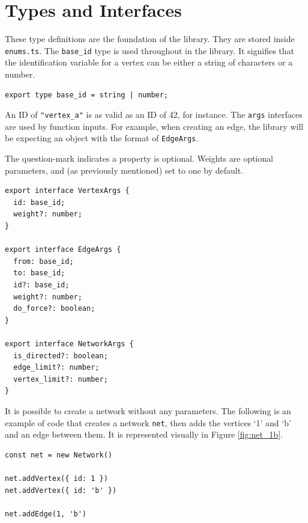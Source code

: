 \chapter{Types and Interfaces}
These type definitions are the foundation of the library.
They are stored inside \texttt{enums.ts}.
The \texttt{base_id} type is used throughout in the library.
It signifies that the identification variable for a vertex can be either
a string of characters or a number.

\begin{verbatim}
export type base_id = string | number;
\end{verbatim}

An ID of \texttt{"vertex_a"} is as valid as an ID of 42, for instance.
The \texttt{args} interfaces are used by function inputs.
For example, when creating an edge,
the library will be expecting an object with the format of \texttt{EdgeArgs}.

The question-mark indicates a property is optional.
Weights are optional parameters, and (as previously mentioned) set to one by default.

\begin{verbatim}
export interface VertexArgs {
  id: base_id;
  weight?: number;
}

export interface EdgeArgs {
  from: base_id;
  to: base_id;
  id?: base_id;
  weight?: number;
  do_force?: boolean;
}

export interface NetworkArgs {
  is_directed?: boolean;
  edge_limit?: number;
  vertex_limit?: number;
}
\end{verbatim}

It is possible to create a network without any parameters.
The following is an example of code that creates a network \texttt{net},
then adds the vertices `1' and `b' and an edge between them.
It is represented visually in Figure \ref{fig:net_1b}.

\begin{verbatim}
const net = new Network()

net.addVertex({ id: 1 })
net.addVertex({ id: 'b' })

net.addEdge(1, 'b')
\end{verbatim}

